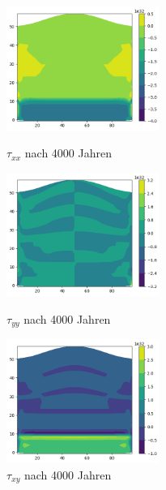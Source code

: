 \documentclass[12pt]{article}
\begin{document}
\begin{figure}[H]
	\begin{minipage}[hbt]{0.25\textwidth}
		\centering
		\includegraphics[width=5cm]{A2_tauxx_4000.png}
		\caption{$\tau_{xx}$ nach 4000 Jahren}
		\label{Bild1}
	\end{minipage}
	\hfill
	\begin{minipage}[hbt]{0.25\textwidth}
		\centering
		\includegraphics[width=5cm]{A2_tauyy_4000.png}
		\caption{$\tau_{yy}$ nach 4000 Jahren}
		\label{Bild2}
	\end{minipage}
	\hfill
	\begin{minipage}[hbt]{0.25\textwidth}
		\centering
		\includegraphics[width=5cm]{A2_tauxy_4000.png}
		\caption{$\tau_{xy}$ nach 4000 Jahren}
		\label{Bild2}
	\end{minipage}
\end{figure}
\end{document}
